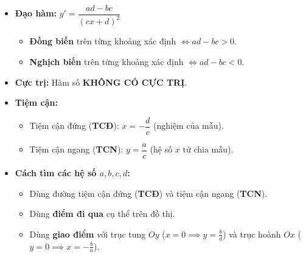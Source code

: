 \documentclass[12pt,a4paper]{article}
\begin{document}
\newpage


\vspace{0.15cm}

\begin{theorybox}
    \begin{itemize}\setlength{\itemsep}{3pt}
        \item \textbf{Đạo hàm:} $y' = \dfrac{ad - bc}{(cx + d)^2}$
        \begin{itemize}\setlength{\itemsep}{2pt}
            \item \textbf{Đồng biến} trên từng khoảng xác định $\iff ad - bc > 0$.
            \item \textbf{Nghịch biến} trên từng khoảng xác định $\iff ad - bc < 0$.
        \end{itemize}
        \item \textbf{Cực trị:} Hàm số \textcolor{accentred}{\textbf{KHÔNG CÓ CỰC TRỊ}}.
        \item \textbf{Tiệm cận:}
        \begin{itemize}\setlength{\itemsep}{2pt}
            \item Tiệm cận đứng (\textbf{TCĐ}): $x = -\dfrac{d}{c}$ (nghiệm của mẫu).
            \item Tiệm cận ngang (\textbf{TCN}): $y = \dfrac{a}{c}$ (hệ số $x$ tử chia mẫu).
        \end{itemize}
        \item \textbf{Cách tìm các hệ số $a, b, c, d$:}
        \begin{itemize}\setlength{\itemsep}{2pt}
            \item Dùng đường tiệm cận đứng (\textbf{TCĐ}) và tiệm cận ngang (\textbf{TCN}).
            \item Dùng \textbf{điểm đi qua} cụ thể trên đồ thị.
            \item Dùng \textbf{giao điểm} với trục tung $Oy$ ($x=0 \implies y=\frac{b}{d}$) và trục hoành $Ox$ ($y=0 \implies x=-\frac{b}{a}$).
        \end{itemize}
    \end{itemize}
\end{theorybox}

\vspace{0.25cm}
\end{document}
